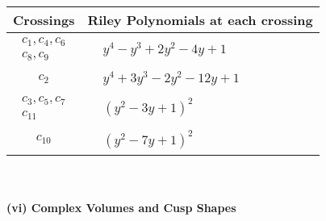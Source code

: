 \documentclass[1p]{elsarticle_modified}
\theoremstyle{definition}
\begin{document}
\begin{tabular}{m{50pt}|m{274pt}}
Crossings & \hspace{64pt}Riley Polynomials at each crossing \\
\hline $$\begin{aligned}c_{1},c_{4},c_{6}\\c_{8},c_{9}\end{aligned}$$&$\begin{aligned}
&y^4- y^3+2 y^2-4 y+1
\end{aligned}$\\
\hline $$\begin{aligned}c_{2}\end{aligned}$$&$\begin{aligned}
&y^4+3 y^3-2 y^2-12 y+1
\end{aligned}$\\
\hline $$\begin{aligned}c_{3},c_{5},c_{7}\\c_{11}\end{aligned}$$&$\begin{aligned}
&(y^2-3 y+1)^2
\end{aligned}$\\
\hline $$\begin{aligned}c_{10}\end{aligned}$$&$\begin{aligned}
&(y^2-7 y+1)^2
\end{aligned}$\\
\hline
\end{tabular}\\~\\
\newpage\flushleft \textbf{(vi) Complex Volumes and Cusp Shapes}
\end{document}
